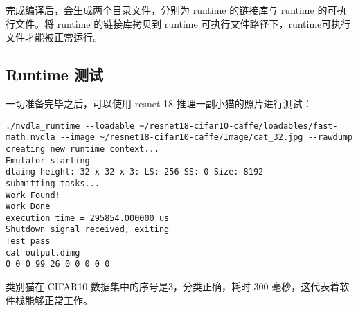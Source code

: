 完成编译后，会生成两个目录文件，分别为 runtime 的链接库与 runtime 的可执行文件。将 runtime 的链接库拷贝到 runtime 可执行文件路径下，runtime可执行文件才能被正常运行。

\subsection{Runtime 测试}

一切准备完毕之后，可以使用 resnet-18 推理一副小猫的照片进行测试：

\begin{lstlisting}
./nvdla_runtime --loadable ~/resnet18-cifar10-caffe/loadables/fast-math.nvdla --image ~/resnet18-cifar10-caffe/Image/cat_32.jpg --rawdump
creating new runtime context...
Emulator starting
dlaimg height: 32 x 32 x 3: LS: 256 SS: 0 Size: 8192
submitting tasks...
Work Found!
Work Done
execution time = 295854.000000 us
Shutdown signal received, exiting
Test pass
cat output.dimg 
0 0 0 99 26 0 0 0 0 0 
\end{lstlisting}

类别猫在 CIFAR10 数据集中的序号是3，分类正确，耗时 300 毫秒，这代表着软件栈能够正常工作。